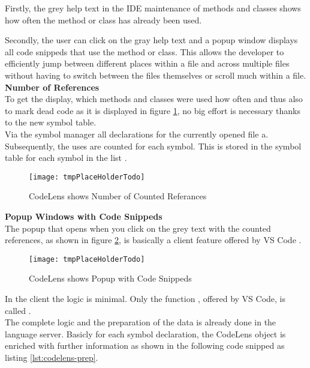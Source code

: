 Firstly, the grey help text in the IDE maintenance of methods and classes
shows how often the method or class has already been used.

Secondly, the user can click on the gray help text and a popup window displays all code snippeds
that use the method or class.
This allows the developer to efficiently jump between different places within a file
and across multiple files without having to switch between the files themselves or scroll much within a file. \\

\textbf{Number of References} \\
To get the display,
which methods and classes were used how often and thus also to mark dead code
as it is displayed in figure \ref{fig:codelens_show_ref_number},
no big effort is necessary thanks to the new symbol table.\\

Via the symbol manager all declarations for the currently opened file a.
Subsequently, the uses are counted for each symbol.
This is stored in the symbol table for each symbol in the list . \\

\begin{figure}[H]
    \centering
    \texttt{[image: tmpPlaceHolderTodo]}
    \caption{CodeLens shows Number of Counted Referances}
    \label{fig:codelens_show_ref_number}
\end{figure}

\textbf{Popup Windows with Code Snippeds} \\
The popup that opens when you click on the grey text
with the counted references, as shown in figure \ref{fig:codelens_show_popup},
is basically a client feature offered by VS Code \cite{vscodeAPI}.

\begin{figure}[H]
    \centering
    \texttt{[image: tmpPlaceHolderTodo]}
    \caption{CodeLens shows Popup with Code Snippeds}
    \label{fig:codelens_show_popup}
\end{figure}

In the client the logic is minimal.
Only the function ,
offered by VS Code, is called \cite{vscodeAPI}. \\

The complete logic and the preparation of the data is already done in the language server.
Basicly for each symbol declaration, the CodeLens object is enriched with further information
as shown in the following code snipped as listing \ref{lst:codelens-prep}.

